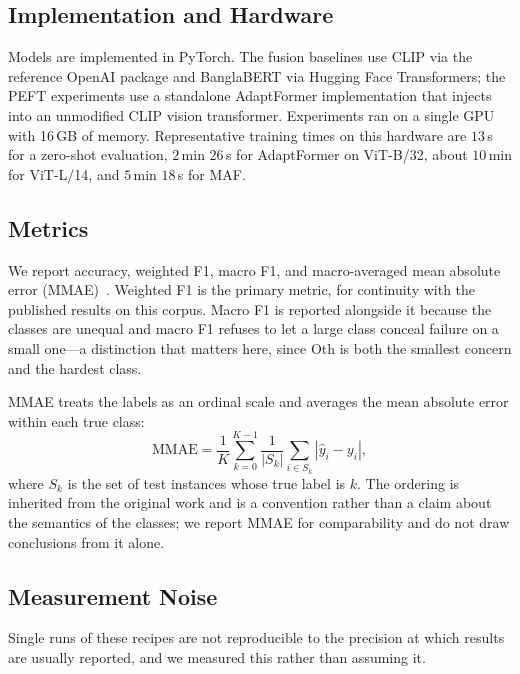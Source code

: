 \documentclass[conference]{IEEEtran}
\begin{document}
\subsection{Implementation and Hardware}

Models are implemented in PyTorch. The fusion baselines use CLIP via the
reference OpenAI package and BanglaBERT via Hugging Face Transformers; the PEFT
experiments use a standalone AdaptFormer implementation that injects into an
unmodified CLIP vision transformer. Experiments ran on a single GPU with 16\,GB
of memory. Representative training times on this hardware are $13$\,s for a
zero-shot evaluation, $2$\,min $26$\,s for AdaptFormer on ViT-B/32, about
$10$\,min for ViT-L/14, and $5$\,min $18$\,s for MAF.

\subsection{Metrics}
\label{sec:metrics}

We report accuracy, weighted F1, macro F1, and macro-averaged mean absolute
error (MMAE)~\cite{baccianella2009}. Weighted F1 is the primary metric, for
continuity with the published results on this corpus. Macro F1 is reported
alongside it because the classes are unequal and macro F1 refuses to let a large
class conceal failure on a small one---a distinction that matters here, since
Oth is both the smallest concern and the hardest class.

MMAE treats the labels as an ordinal scale and averages the mean absolute error
within each true class:
\begin{equation}
\mathrm{MMAE} = \frac{1}{K}\sum_{k=0}^{K-1} \frac{1}{|S_k|}\sum_{i \in S_k} |\hat{y}_i - y_i| ,
\label{eq:mmae}
\end{equation}
where $S_k$ is the set of test instances whose true label is $k$. The ordering
is inherited from the original work and is a convention rather than a claim
about the semantics of the classes; we report MMAE for comparability and do not
draw conclusions from it alone.

\subsection{Measurement Noise}
\label{sec:noise}

Single runs of these recipes are not reproducible to the precision at which
results are usually reported, and we measured this rather than assuming it.
\end{document}
